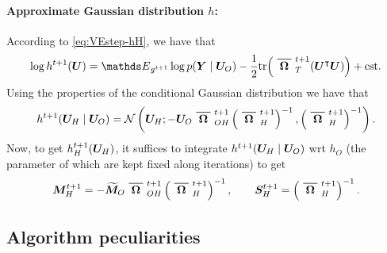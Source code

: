 \paragraph{Approximate Gaussian distribution $h$:} 
According to \eqref{eq:VEstep-hH}, we have that
$$
\log h^{t+1}(\Ubf) 
= \Esp_{g^{t+1}} \log p(\Ybf \mid \Ubf_O) - \frac{1}{2} \tr{\left( \xbar{\Omegabf}^{t+1}_T ( \Ubf^\intercal \Ubf) \right)} + \text{cst}.
$$
Using the properties of the conditional Gaussian distribution we have that
$$
h^{t+1}(\Ubf_H \mid \Ubf_O) = \Ncal\left(\Ubf_H; 
-\Ubf_O \xbar{\Omegabf}^{t+1}_{OH} \left(\xbar{\Omegabf}^{t+1}_{H}\right)^{-1}, \left(\xbar{\Omegabf}^{t+1}_{H}\right)^{-1}\right).
$$
Now, to get $h_H^{t+1}({\boldsymbol{U}}_H)$, it suffices to integrate $h^{t+1}({\boldsymbol{U}}_H \mid {\boldsymbol{U}}_O)$ wrt $h_O$ (the parameter of which are kept fixed along iterations) to get
$$
\Mbf^{t+1}_H = -\widetilde{\Mbf}_O \xbar{\Omegabf}^{t+1}_{OH} \left(\xbar{\Omegabf}^{t+1}_{H}\right)^{-1}, 
\qquad
\Sbf^{t+1}_H = \left(\xbar{\Omegabf}^{t+1}_{H}\right)^{-1}.
$$


\subsection{Algorithm peculiarities} \label{sec:algoSpec}
